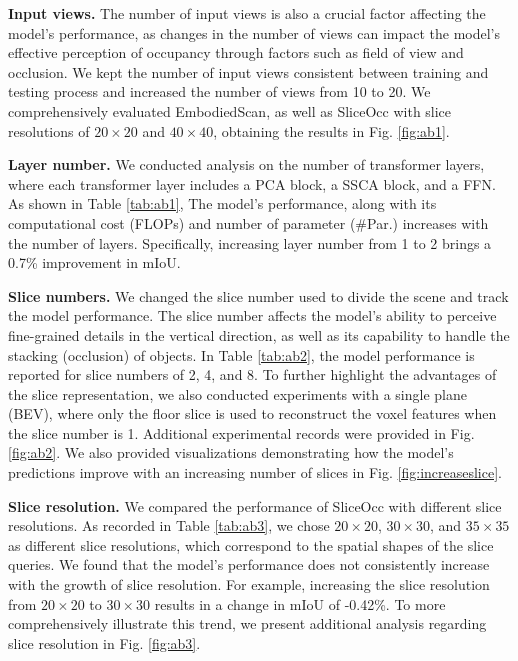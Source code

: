 \documentclass[letterpaper, 10 pt, conference]{ieeeconf}  %
\begin{document}
\noindent \textbf{Input views.} The number of input views is also a crucial factor affecting the model's performance, as changes in the number of views can impact the model's effective perception of occupancy through factors such as field of view and occlusion. We kept the number of input views consistent between training and testing process and increased the number of views from 10 to 20. We comprehensively evaluated EmbodiedScan, as well as SliceOcc with slice resolutions of $20\times20$ and $40\times40$, obtaining the results in Fig. \ref{fig:ab1}. 


\noindent \textbf{Layer number.} We conducted analysis on the number of transformer layers, where each transformer layer includes a PCA block, a SSCA block, and a FFN. As shown in Table \ref{tab:ab1}, The model's performance, along with its computational cost (FLOPs) and number of parameter (\#Par.) increases with the number of layers. Specifically, increasing layer number from 1 to 2  brings a 0.7\% improvement in mIoU. 

\noindent \textbf{Slice numbers.} We changed the slice number used to divide the scene and track the model performance. The slice number affects the model's ability to perceive fine-grained details in the vertical direction, as well as its capability to handle the stacking (occlusion) of objects. In Table \ref{tab:ab2}, the model performance is reported for slice numbers of 2, 4, and 8. To further highlight the advantages of the slice representation, we also conducted experiments with a single plane (BEV), where only the floor slice is used to reconstruct the voxel features when the slice number is 1. Additional experimental records were provided in Fig. \ref{fig:ab2}. We also provided visualizations demonstrating how the model's predictions improve with an increasing number of slices in Fig. \ref{fig:increaseslice}.


\noindent \textbf{Slice resolution.} We compared the performance of SliceOcc with different slice resolutions. As recorded in Table \ref{tab:ab3}, we chose $20\times20$, $30\times30$, and $35\times35$ as different slice resolutions, which correspond to the spatial shapes of the slice queries. We found that the model's performance does not consistently increase with the growth of slice resolution. For example, increasing the slice resolution from $20\times20$ to $30\times30$ results in a change in mIoU of -0.42\%. To more comprehensively illustrate this trend, we present additional analysis regarding slice resolution in Fig. \ref{fig:ab3}.
\end{document}
